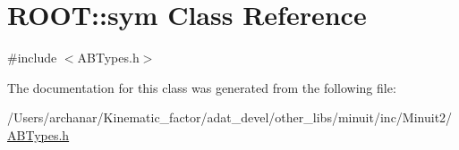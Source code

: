 \hypertarget{classROOT_1_1Minuit2_1_1sym}{}\section{R\+O\+OT\+:\+:sym Class Reference}
\label{classROOT_1_1Minuit2_1_1sym}


{\ttfamily \#include $<$A\+B\+Types.\+h$>$}



The documentation for this class was generated from the following file\+:\begin{DoxyCompactItemize}
\item 
/\+Users/archanar/\+Kinematic\+\_\+factor/adat\+\_\+devel/other\+\_\+libs/minuit/inc/\+Minuit2/\mbox{\hyperlink{other__libs_2minuit_2inc_2Minuit2_2ABTypes_8h}{A\+B\+Types.\+h}}\end{DoxyCompactItemize}
